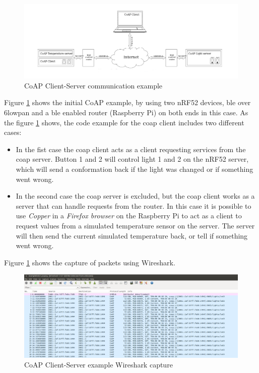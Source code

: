 \begin{figure}[ht]
    \centering
    \includegraphics[width=1.0\textwidth]{CoAPExample2.png}    
    \caption{CoAP Client-Server communication example \cite{nordicNrfDocumentation}}
    \label{fig:CoAPexample1}
\end{figure}


Figure \ref{fig:CoAPexample1} shows the initial CoAP example, by using two nRF52 devices, \gls{ble} over \gls{6lowpan} and a \gls{ble} enabled router (Raspberry Pi) on both ends in this case. As the figure \ref{fig:CoAPexample1} shows, the code example for the \gls{coap} client includes two different cases: 

\begin{itemize}
  \item In the fist case the \gls{coap} client acts as a client requesting services from the \gls{coap} server. Button 1 and 2 will control light 1 and 2 on the nRF52 server, which will send a conformation back if the light was changed or if something went wrong.
  \item In the second case the \gls{coap} server is excluded, but the \gls{coap} client works as a server that can handle requests from the router. In this case it is possible to use \textit{Copper} in a \textit{Firefox browser} on the Raspberry Pi to act as a client to request values from a simulated temperature sensor on the server. The server will  then send the current simulated temperature back, or tell if something went wrong. 
\end{itemize} 

Figure \ref{fig:CoAPexample1} shows the capture of packets using Wireshark. 

\begin{figure}[ht]
    \centering
    \includegraphics[scale=0.27]{CoapEx1captureCropped2.png}    
    \caption{CoAP Client-Server example Wireshark capture}
    \label{fig:CoAPexample2}
\end{figure}


